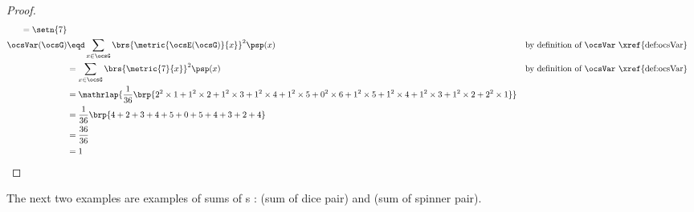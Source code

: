 \begin{tabstr}{0.75}
\begin{proof}
\begin{align*}
{{\begin{array}{c}
         \end{array}}
       \quad= \setn{7}}
  \\
  \ocsVar(\ocsG)
    &\eqd \sum_{x\in\ocsG}\brs{\metric{\ocsE(\ocsG)}{x}}^2\psp(x)
    &&\text{by definition of $\ocsVar$ \xref{def:ocsVar}}
  \\&= \sum_{x\in\ocsG}\brs{\metric{7}{x}}^2\psp(x)
    &&\text{by definition of $\ocsVar$ \xref{def:ocsVar}}
  \\&=\mathrlap{\frac{1}{36}\brp{2^2\times1 + 1^2\times2 + 1^2\times3 + 1^2\times4 + 1^2\times5 + 0^2\times6 +
                        1^2\times5 + 1^2\times4 + 1^2\times3 + 1^2\times2 + 2^2\times1}}
  \\&= \frac{1}{36}\brp{4+2+3+4+5+0+5+4+3+2+4}
  \\&= \frac{36}{36}
  \\&= 1
\end{align*}
\end{proof}




The next two examples are examples of sums of s :
 (sum of dice pair) and  (sum of spinner pair).


\end{tabstr}
